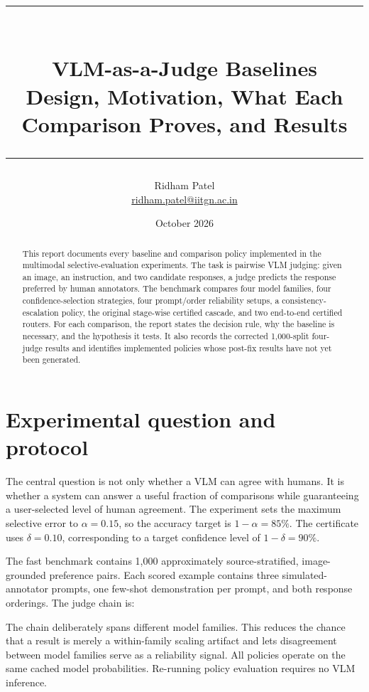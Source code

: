 \documentclass[10pt]{article}
\title{\vspace{-1.2cm}\textcolor{navy}{\rule{\linewidth}{1.2pt}}\\[0.45cm]
\Huge\bfseries VLM-as-a-Judge Baselines\\[0.15cm]
\Large Design, Motivation, What Each Comparison Proves, and Results\\[0.45cm]
\textcolor{navy}{\rule{\linewidth}{1.2pt}}}
\author{Ridham Patel\\\href{mailto:ridham.patel@iitgn.ac.in}{ridham.patel@iitgn.ac.in}}
\date{October 2026}
\newcommand{\target}{85\%}
\newcommand{\deltafull}{0.10}
\begin{document}
\maketitle

\begin{abstract}
This report documents every baseline and comparison policy implemented in the
multimodal selective-evaluation experiments. The task is pairwise VLM judging:
given an image, an instruction, and two candidate responses, a judge predicts the
response preferred by human annotators. The benchmark compares four model families,
four confidence-selection strategies, four prompt/order reliability setups, a
consistency-escalation policy, the original stage-wise certified cascade, and two
end-to-end certified routers. For each comparison, the report states the decision
rule, why the baseline is necessary, and the hypothesis it tests. It also records the
corrected 1,000-split four-judge results and identifies implemented policies whose
post-fix results have not yet been generated.
\end{abstract}

\tableofcontents
\newpage

\section{Experimental question and protocol}

The central question is not only whether a VLM can agree with humans. It is whether a
system can answer a useful fraction of comparisons while guaranteeing a user-selected
level of human agreement. The experiment sets the maximum selective error to
$\alpha=0.15$, so the accuracy target is $1-\alpha=\target$. The certificate uses
$\delta=\deltafull$, corresponding to a target confidence level of $1-\delta=90\%$.

The fast benchmark contains 1,000 approximately source-stratified, image-grounded
preference pairs. Each scored example contains three simulated-annotator prompts, one
few-shot demonstration per prompt, and both response orderings. The judge chain is:

\begin{center}
\end{center}

The chain deliberately spans different model families. This reduces the chance that a
result is merely a within-family scaling artifact and lets disagreement between model
families serve as a reliability signal. All policies operate on the same cached model
probabilities. Re-running policy evaluation requires no VLM inference.
\end{document}
